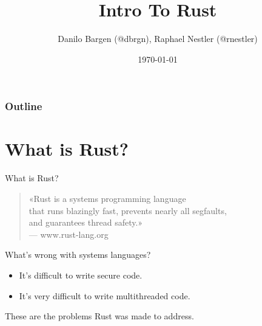 \documentclass[aspectratio=1610,t]{beamer}
\title{Intro To Rust}
\date{\today}
\author{Danilo Bargen (@dbrgn), Raphael Nestler (@rnestler)}
\institute{Coredump Rapperswil}
\begin{document}
{
\maketitle
}


\begin{frame}[noframenumbering]
	\frametitle{Outline}
	\tableofcontents
\end{frame}




\section{What is Rust?}


\begin{frame}[c]{What is Rust?}
	\begin{quote}
		«Rust is a systems programming language\\
		that runs blazingly fast, prevents nearly all segfaults,\\
		and guarantees thread safety.»\\
		\vspace{0.5em}
		{\normalfont \small --- www.rust-lang.org}
	\end{quote}
\end{frame}


\begin{frame}{What's wrong with systems languages?}
	\begin{itemize}
		\item It's difficult to write secure code.
		\item It's very difficult to write multithreaded code.
	\end{itemize}
	These are the problems Rust was made to address.
\end{frame}

\end{document}
